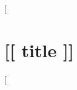 \documentclass[letterpaper,openany,oneside,twocolumn]{book}
\begin{document}
[%

\chapter*{[[ title ]]}
[%
\end{document}
